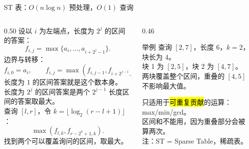 \documentclass[aspectratio=169]{beamer}
\begin{document}
\begin{frame}{ST 表：$O(n\log n)$ 预处理，$O(1)$ 查询}
    \begin{columns}[T]
        \begin{column}{0.50\textwidth}
            \small
            设以 $i$ 为左端点，长度为 $2^j$ 的区间的答案：
            \[
                f_{i,j}=\max\{a_i,\dots,a_{i+2^j-1}\}.
            \]
            边界与转移：
            \[
                f_{i,0}=a_i,\qquad
                f_{i,j}=\max\left(f_{i,j-1},f_{i+2^{j-1},j-1}\right).
            \]
            长度为 $1$ 的区间答案就是这个数本身。\\
            长度为 $2^j$ 的区间答案是两个 $2^{j-1}$ 长度区间的答案取最大。\\
            查询 $[l,r]$，令 $k=\lfloor\log_2(r-l+1)\rfloor$：
            \[
                \max\left(f_{l,k},f_{r-2^k+1,k}\right).
            \]
            找到两个可以覆盖询问的区间，取最大。
        \end{column}
        \begin{column}{0.46\textwidth}
            \begin{exampleblock}{举例}
                \footnotesize
                查询 $[2,7]$，长度 $6$，$k=2$，块长为 $4$。\\
                块 1 为 $[2,5]$，块 2 为 $[4,7]$。\\
                两块覆盖整个区间，重叠的 $[4,5]$ 不影响最大值。
            \end{exampleblock}
            \vspace{0.4em}
            \footnotesize
            只适用于\hl{可重复贡献}的运算：max/min/gcd。\\
            区间和不能用，因为重叠部分会被算两次。\\
            \vspace{1em}
            注：ST = Sparse Table，稀疏表。
        \end{column}
    \end{columns}
\end{frame}
\end{document}
